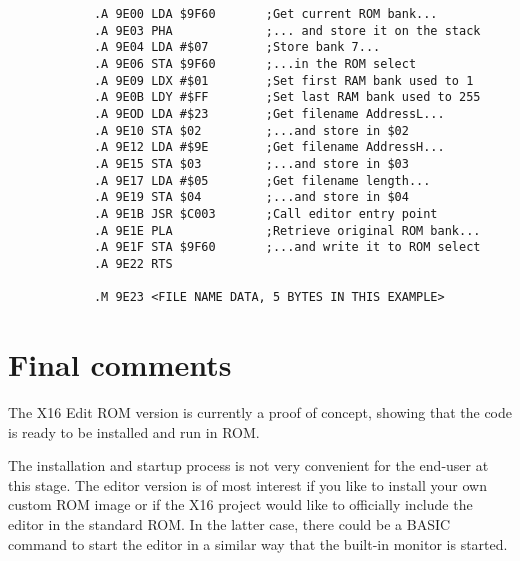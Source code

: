 \documentclass{article}
\begin{document}
        \begin{verbatim}
            .A 9E00 LDA $9F60       ;Get current ROM bank...
            .A 9E03 PHA             ;... and store it on the stack
            .A 9E04 LDA #$07        ;Store bank 7...
            .A 9E06 STA $9F60       ;...in the ROM select
            .A 9E09 LDX #$01        ;Set first RAM bank used to 1
            .A 9E0B LDY #$FF        ;Set last RAM bank used to 255
            .A 9EOD LDA #$23        ;Get filename AddressL...
            .A 9E10 STA $02         ;...and store in $02
            .A 9E12 LDA #$9E        ;Get filename AddressH...
            .A 9E15 STA $03         ;...and store in $03
            .A 9E17 LDA #$05        ;Get filename length...
            .A 9E19 STA $04         ;...and store in $04
            .A 9E1B JSR $C003       ;Call editor entry point
            .A 9E1E PLA             ;Retrieve original ROM bank...
            .A 9E1F STA $9F60       ;...and write it to ROM select
            .A 9E22 RTS

            .M 9E23 <FILE NAME DATA, 5 BYTES IN THIS EXAMPLE>
        \end{verbatim}    


\section{Final comments}

    The X16 Edit ROM version is currently a proof of concept, showing that the code is ready to be installed and run in ROM.
    
    The installation and startup process is not very convenient for the end-user at this stage. The editor version is of most
    interest if you like to install your own custom ROM image or if the X16 project would like to officially include the
    editor in the standard ROM. In the latter case, there could be a BASIC command to start the editor in a similar way
    that the built-in monitor is started.
\end{document}
